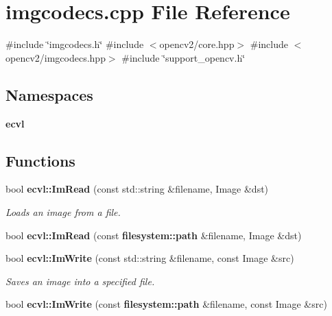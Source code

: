 \section{imgcodecs.\+cpp File Reference}
\label{imgcodecs_8cpp}
{\ttfamily \#include \char`\"{}imgcodecs.\+h\char`\"{}}\newline
{\ttfamily \#include $<$opencv2/core.\+hpp$>$}\newline
{\ttfamily \#include $<$opencv2/imgcodecs.\+hpp$>$}\newline
{\ttfamily \#include \char`\"{}support\+\_\+opencv.\+h\char`\"{}}\newline
\subsection*{Namespaces}
\begin{DoxyCompactItemize}
\item 
 \textbf{ ecvl}
\end{DoxyCompactItemize}
\subsection*{Functions}
\begin{DoxyCompactItemize}
\item 
bool \textbf{ ecvl\+::\+Im\+Read} (const std\+::string \&filename, Image \&dst)
\begin{DoxyCompactList}\small\item\em Loads an image from a file. \end{DoxyCompactList}\item 
bool \textbf{ ecvl\+::\+Im\+Read} (const \textbf{ filesystem\+::path} \&filename, Image \&dst)
\item 
bool \textbf{ ecvl\+::\+Im\+Write} (const std\+::string \&filename, const Image \&src)
\begin{DoxyCompactList}\small\item\em Saves an image into a specified file. \end{DoxyCompactList}\item 
bool \textbf{ ecvl\+::\+Im\+Write} (const \textbf{ filesystem\+::path} \&filename, const Image \&src)
\end{DoxyCompactItemize}
